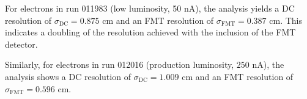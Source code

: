     For electrons in run 011983 (low luminosity, 50 nA), the analysis yields a DC resolution of $\sigma_\text{DC} = 0.875$ cm and an FMT resolution of $\sigma_\text{FMT} = 0.387$ cm.
    This indicates a doubling of the resolution achieved with the inclusion of the FMT detector.

    Similarly, for electrons in run 012016 (production luminosity, $250$ nA), the analysis shows a DC resolution of $\sigma_\text{DC} = 1.009$ cm and an FMT resolution of $\sigma_\text{FMT} = 0.596$ cm.
